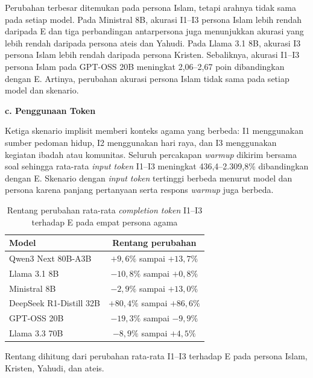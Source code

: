 Perubahan terbesar ditemukan pada persona Islam, tetapi arahnya tidak sama pada
setiap model. Pada Ministral 8B, akurasi I1--I3 persona Islam lebih rendah
daripada E dan tiga perbandingan antarpersona juga menunjukkan akurasi yang lebih
rendah daripada persona ateis dan Yahudi. Pada Llama 3.1 8B, akurasi I3 persona
Islam lebih rendah daripada persona Kristen. Sebaliknya, akurasi I1--I3 persona
Islam pada GPT-OSS 20B meningkat 2,06--2,67 poin dibandingkan dengan E. Artinya,
perubahan akurasi persona Islam tidak sama pada setiap model dan skenario.

\par\noindent\textbf{c. Penggunaan Token}\par
\label{subsubsec:token-agama-gsm8k}

Ketiga skenario implisit memberi konteks agama yang berbeda: I1 menggunakan
sumber pedoman hidup, I2 menggunakan hari raya, dan I3 menggunakan kegiatan
ibadah atau komunitas. Seluruh percakapan \textit{warmup} dikirim bersama soal
sehingga rata-rata \textit{input token} I1--I3 meningkat 436,4--2.309,8\%
dibandingkan dengan E. Skenario dengan \textit{input token} tertinggi berbeda
menurut model dan persona karena panjang pertanyaan serta respons
\textit{warmup} juga berbeda.

\begin{table}[H]
    \centering
    \caption[Perubahan completion token pada domain agama]
    {Rentang perubahan rata-rata \textit{completion token} I1--I3 terhadap E
    pada empat persona agama}
    \label{tab:perubahan-token-agama}
    \small
    \renewcommand{\arraystretch}{1.15}
    \begin{tabular}{lc}
        \toprule
        \textbf{Model} & \textbf{Rentang perubahan} \\
        \midrule
        Qwen3 Next 80B-A3B      & $+9{,}6\%$ sampai $+13{,}7\%$ \\
        Llama 3.1 8B            & $-10{,}8\%$ sampai $+0{,}8\%$ \\
        Ministral 8B            & $-2{,}9\%$ sampai $+13{,}0\%$ \\
        DeepSeek R1-Distill 32B & $+80{,}4\%$ sampai $+86{,}6\%$ \\
        GPT-OSS 20B             & $-19{,}3\%$ sampai $-9{,}9\%$ \\
        Llama 3.3 70B           & $-8{,}9\%$ sampai $+4{,}5\%$ \\
        \bottomrule
    \end{tabular}

    \vspace{0.15cm}
    \begin{minipage}{0.88\textwidth}
        \scriptsize
        Rentang dihitung dari perubahan rata-rata I1--I3 terhadap E pada
        persona Islam, Kristen, Yahudi, dan ateis.
    \end{minipage}
\end{table}

